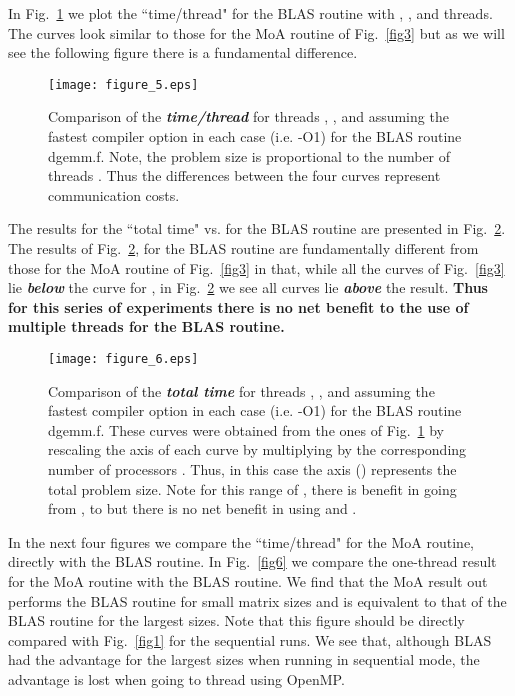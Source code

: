 \documentclass[aps,prl,twocolumn,groupedaddress,floatfix]{revtex4}
\begin{document}
In Fig.~\ref{fig4} we plot the ``time/thread" for the BLAS routine with
, ,  and  threads.  The curves look similar to those for
the MoA routine of Fig.~\ref{fig3} but as we will see the following figure
there is a fundamental difference.

\begin{figure} 
\texttt{[image: figure\_5.eps]}\caption{
\label{fig4}
Comparison of the {\bf \em time/thread} for threads , ,
 and  assuming the fastest compiler option in each case (i.e. -O1)
for the BLAS routine dgemm.f.  Note, the problem size is proportional to the 
number of threads .  Thus the differences between the four curves represent 
communication costs.
}
\end{figure}

The results for the ``total time" vs.  for the BLAS routine are presented
in Fig.~\ref{fig5}.  The results of Fig.~\ref{fig5}, for the BLAS routine
are fundamentally different from those for the MoA routine of Fig.~\ref{fig3}
in that, while all the  curves of Fig.~\ref{fig3} lie {\bf \em below}
the curve for , in Fig.~\ref{fig5} we see all  curves
lie {\bf \em above} the  result. {\bf Thus for this series of experiments
there is no net benefit to the use of multiple threads for the BLAS routine.}

\begin{figure} 
\texttt{[image: figure\_6.eps]}\caption{
\label{fig5}
Comparison of the {\bf \em total time} for threads
, ,  and  assuming the fastest compiler option in each
case (i.e. -O1) for the BLAS routine dgemm.f.   These curves were obtained 
from the ones of Fig.~\ref{fig4} by rescaling the  axis of each curve 
by multiplying by the corresponding number of processors .  Thus, in this 
case the  axis () represents the total problem size.  Note for this 
range of , there is benefit in going from , to  but there is no
net benefit in using  and .
}
\end{figure}

In the next four figures we compare the ``time/thread" for the MoA routine,
directly with the BLAS routine.  In Fig.~\ref{fig6} we compare the one-thread
result for the MoA routine with the BLAS routine.  We find that the MoA
result out performs the BLAS routine for small matrix sizes and is equivalent
to that of the BLAS routine for the largest sizes.  Note that this figure
should be directly compared with Fig.~\ref{fig1} for the sequential 
runs.  We see that, although BLAS had the advantage for the largest sizes
when running in sequential mode, the advantage is lost when going to 
 thread using OpenMP.
\end{document}
